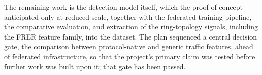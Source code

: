 The remaining work is the detection model itself, which the proof of concept
anticipated only at reduced scale, together with the federated training pipeline, the
comparative evaluation, and extraction of the ring-topology signals, including the FRER
feature family, into the dataset. The plan sequenced a central decision gate, the
comparison between protocol-native and generic traffic features, ahead of federated
infrastructure, so that the project's primary claim was tested before further work was
built upon it; that gate has been passed.

\appendix
